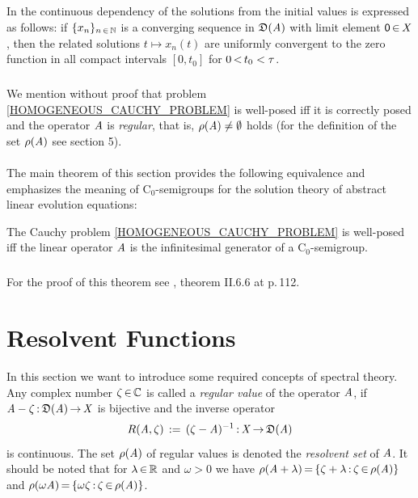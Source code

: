 \documentclass[11pt,twoside]{article}
\begin{document}
\subparagraph{}
In \cite{EN}
the continuous dependency of the solutions from the initial values
is expressed as follows:
if $\{x_n\}_{n {\,\in\,} {\mathbb{N}}}$ is a converging sequence in $\mathfrak{D}(\mathit{A})$
with limit element ${\mathsf{0}} {\,\in\,} \mathit{X}$,
then the related solutions $t \mapsto x_n(t)$ are uniformly convergent
to the zero function in all compact intervals $[0,t_0]$
for $0 {\,<\,} t_0 < \tau$.

\subparagraph{}
We mention without proof
that problem \eqref{HOMOGENEOUS_CAUCHY_PROBLEM} is well-posed
iff
it is correctly posed and the operator $\mathit{A}$ is \textit{regular},
that is,
$\rho(\mathit{A}) \ne \emptyset$ holds
(for the definition of the set $\rho(\mathit{A})$ see section 5).

\paragraph{}
The main theorem of this section provides the following equivalence
and emphasizes the meaning of C$_0$-semigroups for the solution theory
of abstract linear evolution equations:

\begin{theorem}
The Cauchy problem \eqref{HOMOGENEOUS_CAUCHY_PROBLEM} is well-posed
iff
the linear operator $\mathit{A}$ is the infinitesimal generator of a C$_0$-semigroup.
\end{theorem}

\subparagraph{}
For the proof of this theorem see \cite{EN},
theorem II.6.6 at p.\,112.


\section{Resolvent Functions}
In this section we want to introduce some required concepts of spectral theory.
Any complex number $\zeta {\,\in\,} {\mathbb{C}}$ is called a \textit{regular value}
of the operator $\mathit{A}$,
if $\mathit{A} - \zeta {\,:\,} \mathfrak{D}(\mathit{A}) {\,\to\,} \mathit{X}$ is bijective
and the inverse operator
\[
R(\mathit{A},\zeta) \,:=\, (\zeta -\mathit{A})^{-1} {\,:\,} \mathit{X} {\,\to\,} \mathfrak{D}(\mathit{A})
\]
is continuous.
The set $\rho(\mathit{A})$ of regular values is denoted
the \textit{resolvent set} of $\mathit{A}$.
It should be noted that for $\lambda {\,\in\,} {\mathbb{R}}$ and $\omega > 0$
we have $\rho(\mathit{A}+\lambda) {\,=\,} \{\zeta+\lambda {\,:\,} \zeta {\,\in\,} \rho(\mathit{A})\}$
and $\rho(\omega \mathit{A}) {\,=\,} \{\omega \zeta {\,:\,} \zeta {\,\in\,} \rho(\mathit{A})\}$.
\end{document}
